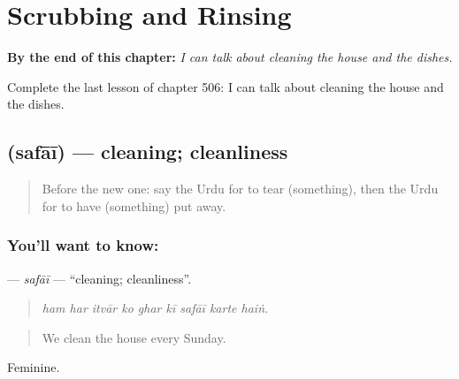
\chapter{Scrubbing and Rinsing}
\label{ch:ur-scrubbing-and-rinsing}

\begin{chapteropening}
\textbf{By the end of this chapter:} \emph{I can talk about cleaning the house and the dishes.}

Complete the last lesson of chapter 506: I can talk about cleaning the house and the dishes.
\end{chapteropening}

\section[\texorpdfstring{\ur{صفائی} (safāī)}{صفائی (safāī)}]{ (safāī) — cleaning; cleanliness}

\label{lesson:UR-C506-safai}



\begin{quote}
Before the new one: say the Urdu for to tear (something), then the Urdu for to have (something) put away.
\end{quote}

\subsection*{You'll want to know: }
\textbf{} — \emph{safāī} — \textquotedblleft{}cleaning; cleanliness\textquotedblright{}.

\begin{quote}
        
\end{quote}

\begin{quote}
\emph{ham har itvār ko ghar kī safāī karte haiṅ.}
\end{quote}

\begin{quote}
We clean the house every Sunday.
\end{quote}

Feminine.

